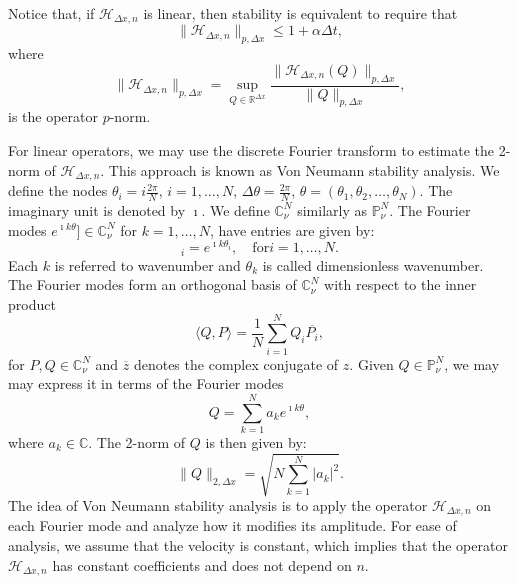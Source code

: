 Notice that, if $\mathcal{H}_{\Delta x,n}$ is linear, then stability is equivalent to require that
\begin{equation*}
	\|\mathcal{H}_{\Delta x,n}\|_{p,\Delta x} \leq 1+ \alpha \Delta t,
\end{equation*}
where
\begin{equation*}
	\|\mathcal{H}_{\Delta x,n}\|_{p,\Delta x} = \sup_{Q\in \mathbb{R}^{\Delta x}} \frac{\|\mathcal{H}_{\Delta x,n}(Q)\|_{p,\Delta x}}{\|Q\|_{p,\Delta x}},
\end{equation*}
is the operator $p$-norm.

For linear operators, we may use the discrete Fourier transform \citep{trefethen:2000}
to estimate the 2-norm of $\mathcal{H}_{\Delta x,n}$. This approach is known as Von Neumann stability analysis.
We define the nodes $\theta_i = i\frac{2\pi}{N}$, $i=1, \ldots, N$, $\Delta \theta = \frac{2\pi}{N}$,
$\theta = (\theta_1, \theta_2, \ldots, \theta_N)$.
The imaginary unit is denoted by $\imath$.
We define $\mathbb{C}^{N}_{\nu}$  similarly as $\mathbb{P}^{N}_{\nu}$.
The Fourier modes $e^{\imath k \theta}] \in \mathbb{C}^{N}_{\nu}$ for $k=1, \ldots, N$, have entries are given by:
\begin{equation*}
	[e^{\imath k \theta}]_i = e^{\imath k\theta_i},\quad \text{for} i=1, \ldots, N.
\end{equation*}
Each $k$ is referred to wavenumber and $\theta_k$ is called  dimensionless wavenumber.
The Fourier modes form an orthogonal basis of $\mathbb{C}^N_{\nu}$ with respect to the 
inner product
\begin{equation*}
	\langle Q, P \rangle = \frac{1}{N}\sum_{i=1}^{N}{Q_i \overline{P_i}},
\end{equation*}
for $P, Q \in \mathbb{C}^{N}_{\nu}$ and $\overline{z}$ denotes the complex conjugate of $z$. 
Given $Q \in \mathbb{P}^{N}_{\nu}$, we may may express it in terms of the Fourier modes
\begin{equation*}
	Q = \sum_{k=1}^{N} a_k e^{\imath k \theta},
\end{equation*}
where $a_k \in \mathbb{C}$. The 2-norm of $Q$ is then given by:
\begin{equation*}
	\|Q\|_{2,\Delta x} = \sqrt{N \sum_{k=1}^{N} |a_k|^2}.
\end{equation*}
The idea of Von Neumann stability analysis is to apply the operator $\mathcal{H}_{\Delta x,n}$ on each Fourier mode and
analyze how it modifies its amplitude.
For ease of analysis, we assume that the velocity is constant, which implies that
the operator $\mathcal{H}_{\Delta x,n}$ has constant coefficients and does not depend on $n$.
